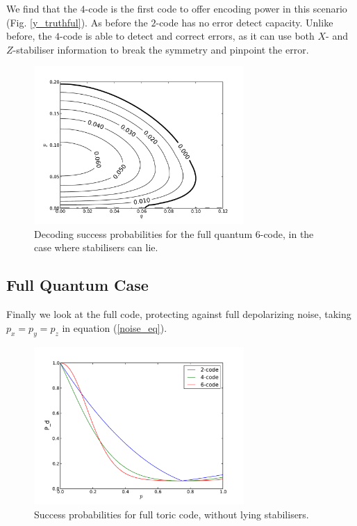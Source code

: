We find that the $4$-code is the first code to offer encoding power in this scenario (Fig. \ref{y_truthful}). As before the $2$-code has no error detect capacity. Unlike before, the $4$-code is able to detect and correct errors, as it can use both $X$- and $Z$-stabiliser information to break the symmetry and pinpoint the error. 

\begin{figure}[htb]
  \begin{center}
    \includegraphics[width=8cm]{assets/y_lying.pdf}
  \end{center}
  \caption{Decoding success probabilities for the full quantum $6$-code, in the case where stabilisers can lie.}
  \label{y_lying}
\end{figure}

\subsection{Full Quantum Case}

Finally we look at the full code, protecting against full depolarizing noise, taking $p_x = p_y = p_z$ in equation (\ref{noise_eq}). 

\begin{figure}[htb]
  \begin{center}
    \includegraphics[width=8cm]{assets/full_truthful.pdf}
  \end{center}
  \caption{Success probabilities for full toric code, without lying stabilisers.}
  \label{full_truthful}
\end{figure}

